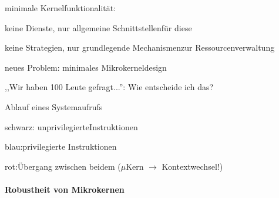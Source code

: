 \documentclass[a4paper]{article}
\begin{document}
\begin{multicols}{3}
    \begin{itemize*}
        \item
        \item
        minimale Kernelfunktionalität:
        \item
        keine Dienste, nur allgemeine Schnittstellenfür diese
        \item
        keine Strategien, nur grundlegende Mechanismenzur Ressourcenverwaltung
        \item
        neues Problem: minimales Mikrokerneldesign
        \item
        ,,Wir haben 100 Leute gefragt...'': Wie entscheide ich das?
        \item
        \begin{itemize*}
            \item Ablauf eines Systemaufrufs
            \item schwarz: unprivilegierteInstruktionen
            \item blau:privilegierte Instruktionen
            \item rot:Übergang zwischen beidem ($\mu$Kern $\rightarrow$  Kontextwechsel!)
        \end{itemize*}
    \end{itemize*}


    \paragraph{Robustheit von
        Mikrokernen}


\end{multicols}
\end{document}
